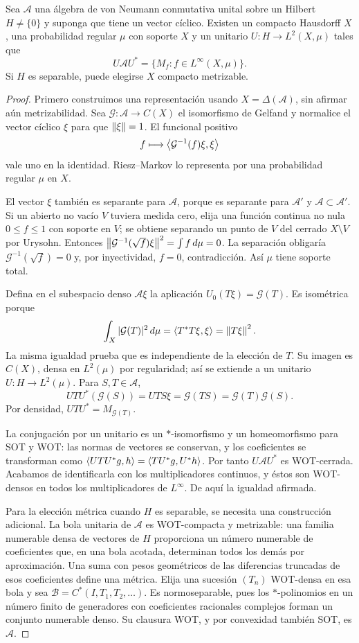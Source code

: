 \begin{teorema}\label{v3:representacion-abeliana-ciclica}
Sea $\mathcal A$ una álgebra de von Neumann conmutativa unital sobre un Hilbert $H\ne\{0\}$ y suponga que tiene un vector cíclico. Existen un compacto Hausdorff $X$, una probabilidad regular $\mu$ con soporte $X$ y un unitario $U:H\to L^2(X,\mu)$ tales que
\[
 U\mathcal A U^*=\{M_f:f\in L^\infty(X,\mu)\}.
\]
Si $H$ es separable, puede elegirse $X$ compacto metrizable.
\end{teorema}
\begin{proof}
Primero construimos una representación usando $X=\Delta(\mathcal A)$, sin afirmar aún metrizabilidad. Sea $\mathcal G:\mathcal A\to C(X)$ el isomorfismo de Gelfand y normalice el vector cíclico $\xi$ para que $\left\lVert\xi\right\rVert=1$. El funcional positivo
\[
 f\longmapsto\left\langle\mathcal G^{-1}(f)\xi,\xi\right\rangle
\]
vale uno en la identidad. Riesz--Markov lo representa por una probabilidad regular $\mu$ en $X$.

El vector $\xi$ también es separante para $\mathcal A$, porque es separante para $\mathcal A'$ y $\mathcal A\subset\mathcal A'$. Si un abierto no vacío $V$ tuviera medida cero, elija una función continua no nula $0\le f\le1$ con soporte en $V$; se obtiene separando un punto de $V$ del cerrado $X\setminus V$ por Urysohn. Entonces
$\left\lVert\mathcal G^{-1}(\sqrt f)\xi\right\rVert^2=\int f\,d\mu=0$. La separación obligaría $\mathcal G^{-1}(\sqrt f)=0$ y, por inyectividad, $f=0$, contradicción. Así $\mu$ tiene soporte total.

Defina en el subespacio denso $\mathcal A\xi$ la aplicación $U_0(T\xi)=\mathcal G(T)$. Es isométrica porque
\[
 \int_X|\mathcal G(T)|^2\,d\mu
 =\left\langle T^*T\xi,\xi\right\rangle=\left\lVert T\xi\right\rVert^2.
\]
La misma igualdad prueba que es independiente de la elección de $T$. Su imagen es $C(X)$, densa en $L^2(\mu)$ por regularidad; así se extiende a un unitario $U:H\to L^2(\mu)$. Para $S,T\in\mathcal A$,
\[
 UTU^*(\mathcal G(S))=UTS\xi=\mathcal G(TS)
 =\mathcal G(T)\mathcal G(S).
\]
Por densidad, $UTU^*=M_{\mathcal G(T)}$.

La conjugación por un unitario es un $*$-isomorfismo y un homeomorfismo para SOT y WOT: las normas de vectores se conservan, y los coeficientes se transforman como
$\left\langle UTU^*g,h\right\rangle=\left\langle TU^*g,U^*h\right\rangle$. Por tanto $U\mathcal A U^*$ es WOT-cerrada. Acabamos de identificarla con los multiplicadores continuos, y éstos son WOT-densos en todos los multiplicadores de $L^\infty$. De aquí la igualdad afirmada.

Para la elección métrica cuando $H$ es separable, se necesita una construcción adicional. La bola unitaria de $\mathcal A$ es WOT-compacta y metrizable: una familia numerable densa de vectores de $H$ proporciona un número numerable de coeficientes que, en una bola acotada, determinan todos los demás por aproximación. Una suma con pesos geométricos de las diferencias truncadas de esos coeficientes define una métrica. Elija una sucesión $(T_n)$ WOT-densa en esa bola y sea $\mathcal B=C^*(I,T_1,T_2,\ldots)$. Es normoseparable, pues los $*$-polinomios en un número finito de generadores con coeficientes racionales complejos forman un conjunto numerable denso. Su clausura WOT, y por convexidad también SOT, es $\mathcal A$.


\end{proof}
